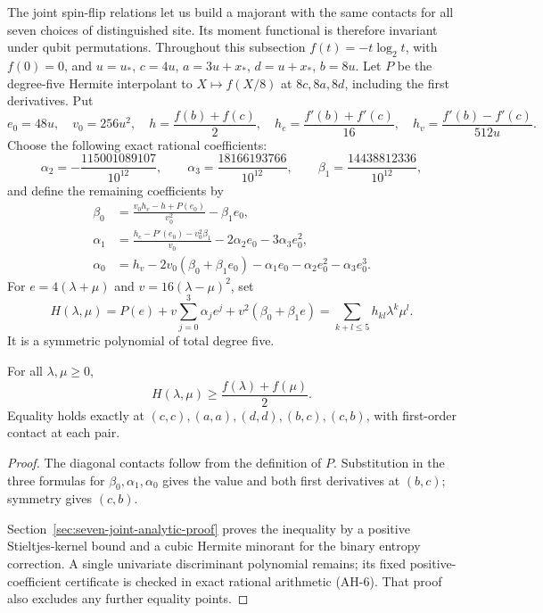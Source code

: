 The joint spin-flip relations let us build a majorant with the same contacts for all seven choices of
distinguished site. Its moment functional is therefore invariant under qubit permutations.
Throughout this subsection $f(t)=-t\log_2t$, with $f(0)=0$, and
$u=u_*$, $c=4u$, $a=3u+x_*$, $d=u+x_*$, $b=8u$.
Let $P$ be the degree-five Hermite interpolant to $X\mapsto f(X/8)$
at $8c,8a,8d$, including the first derivatives. Put
\[
 e_0=48u,\quad v_0=256u^2,\quad
 h=\frac{f(b)+f(c)}2,\quad
 h_e=\frac{f'(b)+f'(c)}{16},\quad
 h_v=\frac{f'(b)-f'(c)}{512u}.
\]
Choose the following exact rational coefficients:
\[
 \alpha_2=-\frac{115001089107}{10^{12}},\qquad
 \alpha_3=\frac{18166193766}{10^{12}},\qquad
 \beta_1=\frac{14438812336}{10^{12}},
\]
and define the remaining coefficients by
\begin{align*}
 \beta_0&=\frac{v_0h_v-h+P(e_0)}{v_0^2}-\beta_1e_0,\\
 \alpha_1&=\frac{h_e-P'(e_0)-v_0^2\beta_1}{v_0}
             -2\alpha_2e_0-3\alpha_3e_0^2,\\
 \alpha_0&=h_v-2v_0(\beta_0+\beta_1e_0)
             -\alpha_1e_0-\alpha_2e_0^2-\alpha_3e_0^3.
\end{align*}
For $e=4(\lambda+\mu)$ and $v=16(\lambda-\mu)^2$, set
\begin{equation}\label{eq:seven-joint-H}
 H(\lambda,\mu)=P(e)+v\sum_{j=0}^3\alpha_je^j
                          +v^2(\beta_0+\beta_1e)
                 =\sum_{k+l\le5}h_{kl}\lambda^k\mu^l.
\end{equation}
It is a symmetric polynomial of total degree five.

\begin{lemma}
\label{lem:seven-joint-scalar-majorant}
For all $\lambda,\mu\ge0$,
\[
 H(\lambda,\mu)\ge\frac{f(\lambda)+f(\mu)}2.
\]
Equality holds exactly at
$(c,c),(a,a),(d,d),(b,c),(c,b)$, with first-order contact at each pair.
\end{lemma}
\begin{proof}
The diagonal contacts follow from the definition of $P$. Substitution
in the three formulas for $\beta_0,\alpha_1,\alpha_0$ gives the value
and both first derivatives at $(b,c)$; symmetry gives $(c,b)$.

Section~\ref{sec:seven-joint-analytic-proof} proves the inequality by a
positive Stieltjes-kernel bound and a cubic Hermite minorant for the binary
entropy correction. A single univariate discriminant polynomial remains;
its fixed positive-coefficient certificate is checked in exact rational
arithmetic (AH-6). That proof also excludes any further equality points.
\end{proof}

